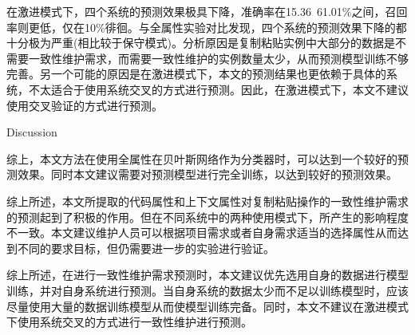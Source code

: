 在激进模式下，四个系统的预测效果极具下降，准确率在15.36~61.01\%之间，召回率则更低，仅在10\%徘徊。与全属性实验对比发现，四个系统的预测效果下降的都十分极为严重(相比较于保守模式)。分析原因是复制粘贴实例中大部分的数据是不需要一致性维护需求，而需要一致性维护的实例数量太少，从而预测模型训练不够完善。另一个可能的原因是在激进模式下，本文的预测结果也更依赖于具体的系统，不太适合于使用系统交叉的方式进行预测。因此，在激进模式下，本文不建议使用交叉验证的方式进行预测。

{Discussion}

综上，本文方法在使用全属性在贝叶斯网络作为分类器时，可以达到一个较好的预测效果。同时本文建议需要对预测模型进行完全训练，以达到较好的预测效果。

综上所述，本文所提取的代码属性和上下文属性对复制粘贴操作的一致性维护需求的预测起到了积极的作用。但在不同系统中的两种使用模式下，所产生的影响程度不一致。本文建议维护人员可以根据项目需求或者自身需求适当的选择属性从而达到不同的要求目标，但仍需要进一步的实验进行验证。

综上所述，在进行一致性维护需求预测时，本文建议优先选用自身的数据进行模型训练，并对自身系统进行预测。当自身系统的数据太少而不足以训练模型时，应该尽量使用大量的数据训练模型从而使模型训练完备。同时，本文不建议在激进模式下使用系统交叉的方式进行一致性维护进行预测。



